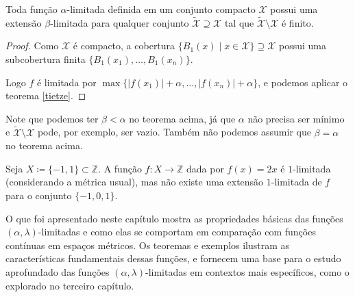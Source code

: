\begin{corollary}
  Toda função $\alpha$-limitada definida em um conjunto compacto $\mathcal{X}$ possui uma extensão $\beta$-limitada para qualquer conjunto $\tilde{\mathcal{X}} \supseteq \mathcal{X}$ tal que $\tilde{\mathcal{X}} \setminus \mathcal{X}$ é finito.
\end{corollary}
\begin{proof}
  Como $\mathcal{X}$ é compacto, a cobertura $\{ B_1(x) \mid x \in \mathcal{X} \} \supseteq \mathcal{X}$ possui uma subcobertura finita $\{ B_1(x_1), \dots, B_1(x_n)\}$.

  Logo $f$ é limitada por $\max\{\lvert f(x_1) \rvert + \alpha, \dots, \lvert f(x_n) \rvert + \alpha\}$, e podemos aplicar o teorema \ref{tietze}.
\end{proof}

Note que podemos ter $\beta < \alpha$ no teorema acima, já que $\alpha$ não precisa ser mínimo e $\tilde{\mathcal{X}} \setminus \mathcal{X}$ pode, por exemplo, ser vazio. Também não podemos assumir que $\beta = \alpha$ no teorema acima.

\begin{example}
  Seja $X \coloneqq \{-1, 1\} \subset \mathbb{Z}$. A função $f : X \to \mathbb{Z}$ dada por $f(x) = 2x$ é $1$-limitada (considerando a métrica usual), mas não existe uma extensão $1$-limitada de $f$ para o conjunto $\{-1, 0, 1\}$.
\end{example}

O que foi apresentado neste capítulo mostra as propriedades básicas das funções $(\alpha,\lambda)$-limitadas e como elas se comportam em comparação com funções contínuas em espaços métricos. Os teoremas e exemplos ilustram as características fundamentais dessas funções, e fornecem uma base para o estudo aprofundado das funções $(\alpha,\lambda)$-limitadas em contextos mais específicos, como o explorado no terceiro capítulo.
